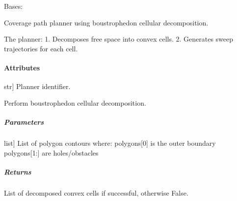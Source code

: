 \documentclass[letterpaper,10pt,english]{sphinxmanual}
\begin{document}
\begin{fulllineitems}
\label{\detokenize{mirte_lc_nav2.navigators:mirte_lc_nav2.navigators.BousPath}}
\pysigstartsignatures
\pysiglinewithargsret
{}
{\sphinxparamcomma {}}
{}
\pysigstopsignatures
\sphinxAtStartPar
Bases: {\hyperref[\detokenize{mirte_lc_nav2.navigator_types:mirte_lc_nav2.navigator_types.SystematicNavigator}]{}}

\sphinxAtStartPar
Coverage path planner using boustrophedon cellular decomposition.

\sphinxAtStartPar
The planner:
1. Decomposes free space into convex cells.
2. Generates sweep trajectories for each cell.


\paragraph{Attributes}
\label{\detokenize{mirte_lc_nav2.navigators:attributes}}\begin{description}
\sphinxlineitem{name}{[}str{]}
\sphinxAtStartPar
Planner identifier.

\end{description}

\begin{fulllineitems}
\label{\detokenize{mirte_lc_nav2.navigators:mirte_lc_nav2.navigators.BousPath.bcd}}
\pysigstartsignatures
\pysiglinewithargsret
{}
{}
{}
\pysigstopsignatures
\sphinxAtStartPar
Perform boustrophedon cellular decomposition.


\subparagraph{Parameters}
\label{\detokenize{mirte_lc_nav2.navigators:parameters}}\begin{description}
\sphinxlineitem{polygons}{[}list{]}
\sphinxAtStartPar
List of polygon contours where:
\sphinxhyphen{} polygons{[}0{]} is the outer boundary
\sphinxhyphen{} polygons{[}1:{]} are holes/obstacles

\end{description}


\subparagraph{Returns}
\label{\detokenize{mirte_lc_nav2.navigators:returns}}\begin{description}
\sphinxAtStartPar
List of decomposed convex cells if successful,
otherwise False.


\end{description}
\end{fulllineitems}
\end{fulllineitems}
\end{document}
